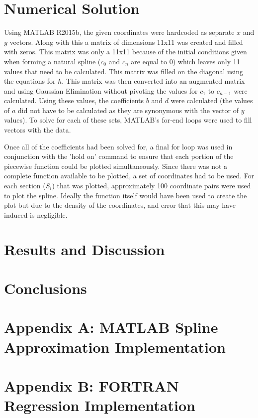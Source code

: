 \documentclass[12pt, letterpaper]{article} %
\begin{document}
\section*{Numerical Solution}
Using MATLAB R2015b, the given coordinates were hardcoded as separate $x$ and $y$ vectors. Along with this a matrix of dimensions 11x11 was created and filled with zeros. This matrix was only a 11x11 because of the initial conditions given when forming a natural spline ($c_0$ and $c_n$ are equal to 0) which leaves only 11 values that need to be calculated. This matrix was filled on the diagonal using the equations for $h$. This matrix was then converted into an augmented matrix and using Gaussian Elimination without pivoting the values for $c_1$ to $c_{n-1}$ were calculated. Using these values, the coefficients $b$ and $d$ were calculated (the values of $a$ did not have to be calculated as they are synonymous with the vector of $y$ values). To solve for each of these sets, MATLAB's for-end loops were used to fill vectors with the data. 

Once all of the coefficients had been solved for, a final for loop was used in conjunction with the 'hold on' command to ensure that each portion of the piecewise function could be plotted simultaneously. Since there was not a complete function available to be plotted, a set of coordinates had to be used. For each section ($S_i$) that was plotted, approximately 100 coordinate pairs were used to plot the spline. Ideally the function itself would have been used to create the plot but due to the density of the coordinates, and error that this may have induced is negligible. 

\section*{Results and Discussion}

\section*{Conclusions}

\section*{Appendix A: MATLAB Spline Approximation Implementation}

\section*{Appendix B: FORTRAN Regression Implementation}
\end{document}
